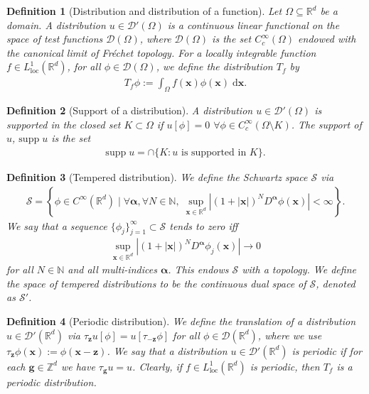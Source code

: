 \documentclass[11pt]{article}
\newcommand{\bg}{\mathbf{g}}
\newcommand{\bx}{\mathbf x}
\newcommand{\bz}{\mathbf z}
\newcommand{\0}{\mathbf{0}}
\newtheorem{defi}{Definition}
\begin{document}
\begin{appendix}
\begin{defi}[Distribution and distribution of a function]
\label{defi:fn_dist}
Let $\Omega\subseteq \mathbb{R}^{d}$ be a domain. A distribution $u\in \mathcal{D}'(\Omega)$ is a continuous linear functional on the space of test functions $\mathcal{D}(\Omega)$, where $\mathcal{D}(\Omega)$ is the set $C^{\infty}_c(\Omega)$ endowed with the \emph{canonical limit of Fréchet topology}. For a locally integrable function $f\in L^1_{\mathrm{loc}}(\mathbb{R}^{d})$, for all $\phi\in \mathcal{D}(\Omega)$, we define the distribution $T_f$ by
\begin{align*}
    T_f\phi := \int_{\Omega}f(\bx)\phi(\bx)\;\mathrm{d}\bx . 
\end{align*}
\end{defi}

\begin{defi}[Support of a distribution]
\label{defi:supp_dist}
    A distribution $u\in \mathcal{D}'(\Omega)$ is supported in the closed set $K\subset \Omega$ if $u[\phi] = 0$ $\forall \phi\in C^{\infty}_c(\Omega\setminus K)$. The \emph{support} of $u$, $\mathrm{supp}\; u$ is the set 
    \begin{align*}
        \mathrm{supp}\; u = \cap \{K: u\text{ is supported in }K\}.
    \end{align*}
\end{defi}

\begin{defi}[Tempered distribution]
    We define the \emph{Schwartz space} $\mathcal{S}$ via
    \begin{align*}
        \mathcal{S} = \left\{\phi\in C^{\infty}(\mathbb{R}^{d})\mid \forall \bm{\alpha}, \forall N\in \mathbb{N},\;\sup_{\bx\in \mathbb{R}^{d}}\left|(1+|\bx|)^{N}D^{\bm{\alpha}}\phi(\bx)\right| < \infty\right\}.
    \end{align*}
    We say that a sequence $\{\phi_j\}^{\infty}_{j=1}\subset \mathcal{S}$ tends to zero iff
    \begin{align*}
        \sup_{\bx\in\mathbb{R}^{d}}|(1+|\bx|)^{N}D^{\bm{\alpha}}\phi_j(\bx)|\to 0 
    \end{align*}
    for all $N\in \mathbb{N}$ and all multi-indices $\bm{\alpha}$. This endows $\mathcal{S}$ with a topology. We define the space of \emph{tempered distributions} to be the continuous dual space of $\mathcal{S}$, denoted as $\mathcal{S}'$.
\end{defi}

\begin{defi}[Periodic distribution]
    We define the translation of a distribution $u\in \mathcal{D}'(\mathbb{R}^{d})$ via $\tau_{\bz}u[\phi] = u[\tau_{-\bz}\phi]$ 
    for all $\phi\in \mathcal{D}(\mathbb{R}^{d})$, where we use $\tau_{\bz}\phi(\bx):= \phi(\bx-\bz)$. 
    We say that a distribution $u\in \mathcal{D}'(\mathbb{R}^{d})$ is periodic if for each $\bg\in \mathbb{Z}^{d}$ we have $\tau_{\bg} u = u$.
    Clearly, if $f\in L^1_{\mathrm{loc}}(\mathbb{R}^{d})$ is periodic, then $T_f$ is a periodic distribution.
\end{defi}


\end{appendix}
\end{document}
